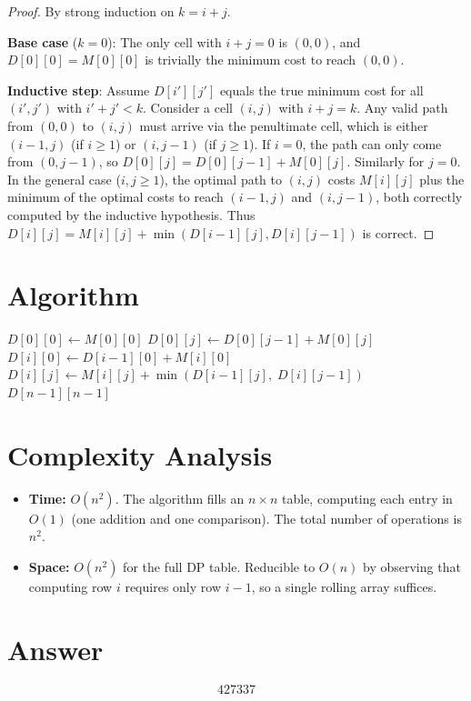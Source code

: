 \documentclass[12pt]{article}
\begin{document}
\begin{proof}
By strong induction on $k = i + j$.

\textbf{Base case} ($k=0$): The only cell with $i+j=0$ is $(0,0)$, and $D[0][0] = M[0][0]$ is trivially the minimum cost to reach $(0,0)$.

\textbf{Inductive step}: Assume $D[i'][j']$ equals the true minimum cost for all $(i',j')$ with $i'+j' < k$. Consider a cell $(i,j)$ with $i+j = k$. Any valid path from $(0,0)$ to $(i,j)$ must arrive via the penultimate cell, which is either $(i-1,j)$ (if $i \geq 1$) or $(i,j-1)$ (if $j \geq 1$). If $i = 0$, the path can only come from $(0,j-1)$, so $D[0][j] = D[0][j-1] + M[0][j]$. Similarly for $j = 0$. In the general case ($i,j \geq 1$), the optimal path to $(i,j)$ costs $M[i][j]$ plus the minimum of the optimal costs to reach $(i-1,j)$ and $(i,j-1)$, both correctly computed by the inductive hypothesis. Thus $D[i][j] = M[i][j] + \min(D[i-1][j], D[i][j-1])$ is correct.
\end{proof}

\section{Algorithm}

\begin{algorithm}[H]
\caption{Minimum Path Sum (Two Ways)}
\begin{algorithmic}[1]
\STATE $D[0][0] \gets M[0][0]$
    \STATE $D[0][j] \gets D[0][j-1] + M[0][j]$
\ENDFOR
{}
    \STATE $D[i][0] \gets D[i-1][0] + M[i][0]$
\ENDFOR
{}
        \STATE $D[i][j] \gets M[i][j] + \min(D[i-1][j],\; D[i][j-1])$
    \ENDFOR
\ENDFOR
\RETURN $D[n-1][n-1]$
\end{algorithmic}
\end{algorithm}

\section{Complexity Analysis}

\begin{itemize}
    \item \textbf{Time:} $O(n^2)$. The algorithm fills an $n \times n$ table, computing each entry in $O(1)$ (one addition and one comparison). The total number of operations is $n^2$.
    \item \textbf{Space:} $O(n^2)$ for the full DP table. Reducible to $O(n)$ by observing that computing row $i$ requires only row $i-1$, so a single rolling array suffices.
\end{itemize}

\section{Answer}

\[
\boxed{427337}
\]
\end{document}
